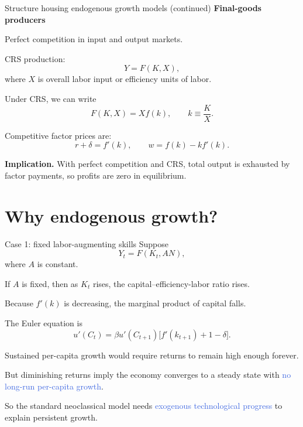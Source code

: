 \documentclass[aspectratio=169,xcolor=dvipsnames]{beamer}
\let\tempone\itemize
\let\temptwo\enditemize
\renewenvironment{itemize}{\tempone\addtolength{\itemsep}{\fill}}{\temptwo}
\providecommand{\blue}[1]{\textcolor{RoyalBlue}{#1}}
\begin{document}
\begin{frame}{Structure housing endogenous growth models (continued)}
\small
\textbf{Final-goods producers}
\begin{itemize}
    \item Perfect competition in input and output markets.
    \item CRS production:
    \[
    Y = F(K,X),
    \]
    where $X$ is overall labor input or efficiency units of labor.
    \item Under CRS, we can write
    \[
    F(K,X)=Xf(k), \qquad k\equiv \frac{K}{X}.
    \]
    \item Competitive factor prices are:
    \[
    r+\delta = f'(k),
    \qquad
    w = f(k)-kf'(k).
    \]
\end{itemize}

\vspace{0.4em}
\textbf{Implication.} With perfect competition and CRS, total output is exhausted by factor payments, so profits are zero in equilibrium.
\end{frame}

\section{Why endogenous growth?}

\begin{frame}{Case 1: fixed labor-augmenting skills}
\small
Suppose
\[
Y_t = F(K_t, AN),
\]
where $A$ is constant.

\begin{itemize}
    \item If $A$ is fixed, then as $K_t$ rises, the capital--efficiency-labor ratio rises.
    \item Because $f'(k)$ is decreasing, the marginal product of capital falls.
    \item The Euler equation is
    \[
    u'(C_t)=\beta u'(C_{t+1})\big[f'(k_{t+1})+1-\delta\big].
    \]
    \item Sustained per-capita growth would require returns to remain high enough forever.
    \item But diminishing returns imply the economy converges to a steady state with \blue{no long-run per-capita growth}.
\end{itemize}

\vspace{0.3em}
So the standard neoclassical model needs \blue{exogenous technological progress} to explain persistent growth.
\end{frame}
\end{document}
